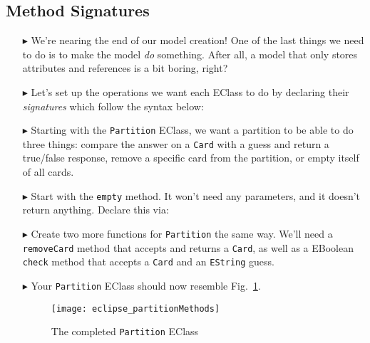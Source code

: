 \newpage
\subsection{Method Signatures}
\texHeader
\hypertarget{static:methods tex}{}

\begin{itemize}

\item[$\blacktriangleright$] We're nearing the end of our model creation! One of the last things we need to do is to make the model \emph{do} something. After
all, a model that only stores attributes and references is a bit boring, right?

\item[$\blacktriangleright$] Let's set up the operations we want each EClass to do by declaring their \emph{signatures} which follow the syntax below:

\item[$\blacktriangleright$] Starting with the \texttt{Partition} EClass, we want a partition to be able to do three things: compare the answer on a
\texttt{Card} with a guess and return a true/false response, remove a specific card from the partition, or empty itself of all cards.

\item[$\blacktriangleright$] Start with the \texttt{empty} method. It won't need any parameters, and it doesn't return anything. Declare this via:

\item[$\blacktriangleright$] Create two more functions for \texttt{Partition} the same way. We'll need a \texttt{removeCard} method that accepts and returns a
\texttt{Card}, as well as a EBoolean \texttt{check} method that accepts a \texttt{Card} and an \texttt{EString} guess. 

\item[$\blacktriangleright$] Your \texttt{Partition} EClass should now resemble Fig.~\ref{eclipse:partitionMethods}.

\vspace{0.5cm}

\begin{figure}[htbp]
	\centering
  \texttt{[image: eclipse\_partitionMethods]}
	\caption{The completed \texttt{Partition} EClass}
	\label{eclipse:partitionMethods}
\end{figure}


\end{itemize}
